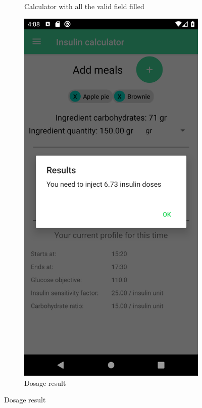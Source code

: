 \begin{figure}[H]
\begin{center}
\begin{subfigure}{.3\textwidth}
            \caption{Calculator with all the valid field filled} 
        \end{subfigure}
        \begin{subfigure}{.3\textwidth}
            \includegraphics[scale=0.1, width=\textwidth]{_figures/dosage_result.png}
            \caption{Dosage result} 
        \end{subfigure}%
    \end{center}
\end{figure}

